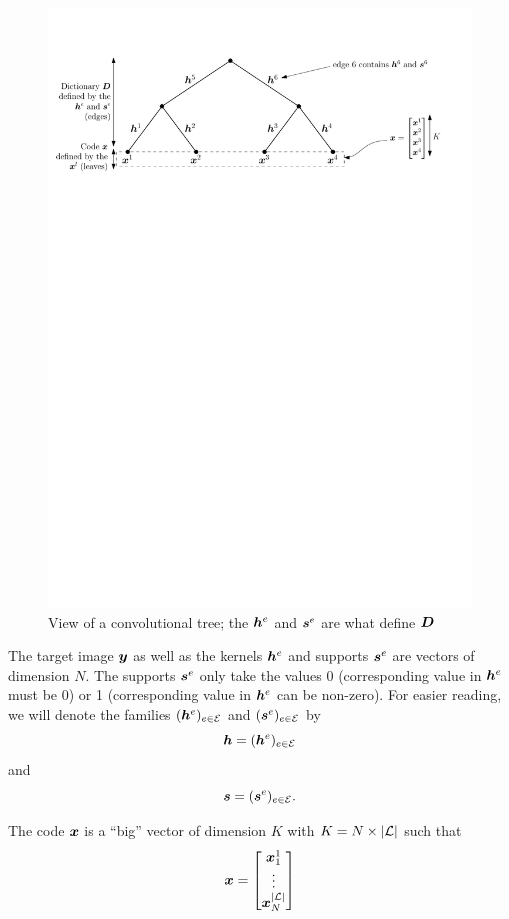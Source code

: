 \begin{figure}[!ht]\centering
\includegraphics[width=\textwidth]{figures/tree.pdf}
\caption{View of a convolutional tree; the $\bm{h}^e$ and $\bm{s}^e$ are what define $\bm{D}$}\label{fig_tree}
\end{figure}

The target image $\bm{y}$ as well as the kernels $\bm{h}^e$ and supports $\bm{s}^e$ are vectors of dimension $N$. The supports $\bm{s}^e$ only take the values 0 (corresponding value in $\bm{h}^e$ must be 0) or 1 (corresponding value in $\bm{h}^e$ can be non-zero). For easier reading, we will denote the families $(\bm{h}^e)_{e \in \mathcal E}$ and $(\bm{s}^e)_{e \in \mathcal E}$ by $$\bm{h} = (\bm{h}^e)_{e \in \mathcal E}$$ and $$\bm{s} = (\bm{s}^e)_{e \in \mathcal E}.$$

The code $\bm{x}$ is a “big” vector of dimension $K$ with $K = N \times |\mathcal L|$ such that $$\bm{x} = \begin{bmatrix}\bm{x}^1_1 \\ \vdots \\ \bm{x}^{|\mathcal L|}_N\end{bmatrix}$$

